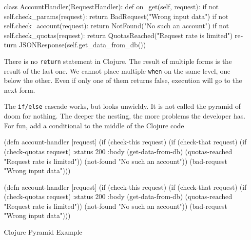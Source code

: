 \else

\begin{english}
  \begin{python}
class AccountHandler(RequestHandler):
  def on_get(self, request):
    if not self.check_params(request):
      return BadRequest("Wrong input data")
    if not self.check_account(request):
      return NotFound("No such an account")
    if not self.check_quotas(request):
      return QuotasReached("Request rate is limited")
    return JSONResponse(self.get_data_from_db())
  \end{python}
\end{english}

\fi

There is no \verb|return| statement in Clojure. The result of multiple forms is the result of the last one. We cannot place multiple \verb|when| on the same level, one below the other. Even if only one of them returns false, execution will go to the next form.


The \verb|if/else| cascade works, but looks unwieldy. It is not called the pyramid of doom for nothing. The deeper the nesting, the more problems the developer has. For fun, add a conditional to the middle of the Clojure code 

\begin{listing}[ht!]

\ifx\DEVICETYPE\MOBILE

\begin{english}
  \begin{clojure}
(defn account-handler [request]
  (if (check-this request)
    (if (check-that request)
      (if (check-quotas request)
        {:status 200
         :body (get-data-from-db)}
        (quotas-reached
          "Request rate is limited"))
      (not-found "No such an account"))
    (bad-request "Wrong input data")))
  \end{clojure}
\end{english}

\else

\begin{english}
  \begin{clojure}
(defn account-handler [request]
  (if (check-this request)
    (if (check-that request)
      (if (check-quotas request)
        {:status 200
         :body (get-data-from-db)}
        (quotas-reached "Request rate is limited"))
      (not-found "No such an account"))
    (bad-request "Wrong input data")))
  \end{clojure}
\end{english}

\fi

\caption{ Clojure Pyramid Example }
\label{fig:clj-pyramid}

\end{listing}

